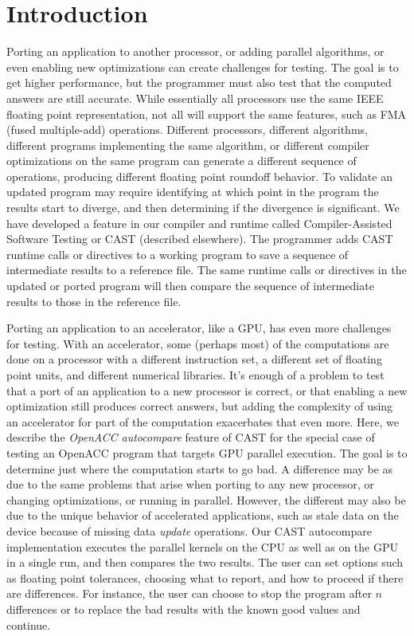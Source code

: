 \section{Introduction}

Porting an application to another processor, or adding parallel algorithms, or even enabling new optimizations can create challenges for testing.
The goal is to get higher performance, but the programmer must also test that the computed answers are still accurate.
While essentially all processors use the same IEEE floating point representation, not all will support the same features, such as FMA (fused multiple-add) operations.
Different processors, different algorithms, different programs implementing the same algorithm, or different compiler optimizations on the same program can generate a different sequence of operations, producing different floating point roundoff behavior.
To validate an updated program may require identifying at which point in the program the results start to diverge, and then determining if the divergence is significant.
We have developed a feature in our compiler and runtime called Compiler-Assisted Software Testing or CAST (described elsewhere).
The programmer adds CAST runtime calls or directives to a working program to save a sequence of intermediate results to a reference file.
The same runtime calls or directives in the updated or ported program will then compare the sequence of intermediate results to those in the reference file.

Porting an application to an accelerator, like a GPU, has even more challenges for testing.
With an accelerator, some (perhaps most) of the computations are done on a processor with a different instruction set, a different set of floating point units, and different numerical libraries.
It's enough of a problem to test that a port of an application to a new processor is correct, or that enabling a new optimization still produces correct answers, but adding the complexity of using an accelerator for part of the computation exacerbates that even more.
Here, we describe the \emph{OpenACC autocompare} feature of CAST for the special case of testing an OpenACC\cite{openacc.16} program that targets GPU parallel execution.
The goal is to determine just where the computation starts to go bad.
A difference may be as due to the same problems that arise when porting to any new processor, or changing optimizations, or running in parallel.
However, the different may also be due to the unique behavior of accelerated applications, such as stale data on the device because of missing data \emph{update} operations.
Our CAST autocompare implementation executes the parallel kernels on the CPU as well as on the GPU in a single run, and then compares the two results.
The user can set options such as floating point tolerances, choosing what to report, and how to proceed if there are differences.
For instance, the user can choose to stop the program after $n$ differences or to replace the bad results with the known good values and continue.

